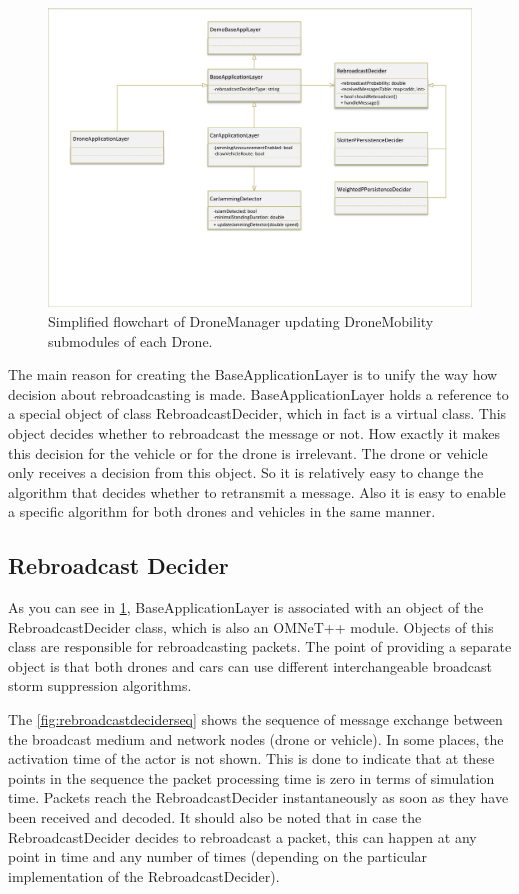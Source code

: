\documentclass[]{nsm-thesis}
\begin{document}
\begin{figure}
	\centering
	\includegraphics[width=1\textwidth]{figures/BaseApplicationLayer.pdf}
	\caption{Simplified flowchart of DroneManager updating DroneMobility submodules of each Drone.}
	\label{fig:baseapplicationlayer}
\end{figure}

The main reason for creating the BaseApplicationLayer is to unify the way how decision about rebroadcasting is made. BaseApplicationLayer holds a reference to a special object of class RebroadcastDecider, which in fact is a virtual class. This object decides whether to rebroadcast the message or not. How exactly it makes this decision for the vehicle or for the drone is irrelevant. The drone or vehicle only receives a decision from this object. So it is relatively easy to change the algorithm that decides whether to retransmit a message. Also it is easy to enable a specific algorithm for both drones and vehicles in the same manner.

\subsection {Rebroadcast Decider}

As you can see in \cref{fig:baseapplicationlayer}, BaseApplicationLayer is associated with an object of the RebroadcastDecider class, which is also an OMNeT++ module. Objects of this class are responsible for rebroadcasting packets. The point of providing a separate object is that both drones and cars can use different interchangeable broadcast storm suppression algorithms. 

The \cref{fig:rebroadcastdeciderseq} shows the sequence of message exchange between the broadcast medium and network nodes (drone or vehicle). In some places, the activation time of the actor is not shown. This is done to indicate that at these points in the sequence the packet processing time is zero in terms of simulation time. Packets reach the RebroadcastDecider instantaneously as soon as they have been received and decoded. It should also be noted that in case the RebroadcastDecider decides to rebroadcast a packet, this can happen at any point in time and any number of times (depending on the particular implementation of the RebroadcastDecider).
\end{document}

